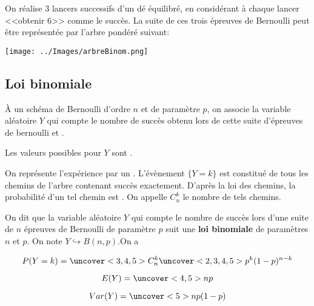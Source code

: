 \documentclass{beamer}
\begin{document}
 \begin{frame}
   \begin{example}
 On réalise $3$ lancers successifs d'un dé équilibré, en considérant à chaque lancer <<obtenir 6>>
 comme le succès. La suite de ces trois épreuves de Bernoulli peut être représentée par l'arbre pondéré
 suivant:
 
  \texttt{[image: ../Images/arbreBinom.png]}
 
  
 \end{example}
 \end{frame}

 \subsection{Loi binomiale}

 \begin{frame}
  
  \begin{definition}
  \`A un schéma de Bernoulli d'ordre $n$ et de paramètre $p$, on associe la variable aléatoire $Y$
  qui compte le nombre de succès obtenu lors de cette suite d'épreuves de bernoulli 
   et . 
  
  Les valeurs possibles pour $Y$ sont .
 \end{definition}
  On représente l'expérience par un . L'évènement $\lbrace Y=k \rbrace$ est constitué 
  de tous les chemins de l'arbre contenant  succès exactement. D'après la loi des chemins, la probabilité
  d'un tel chemin est . On appelle $C_n^k$ le nombre de tels chemins.

 \end{frame}

 \begin{frame}
  \begin{theorem}
   On dit que la variable aléatoire $Y$ qui compte le nombre de succès lors d'une suite de $n$ épreuves
   de Bernoulli de paramètre $p$ suit une \textbf{loi binomiale} de paramètres $n$ et $p$. On note 
   $Y \hookrightarrow B(n,p)$.On a 
   
   $$P(Y=k)=\uncover<3,4,5>{C_n^k} \uncover<2,3,4,5>{p^k (1-p)^{n-k}}$$
   
   $$E(Y)=\uncover<4,5>{np}$$
   
   $$Var(Y)=\uncover<5>{np(1-p)}$$
   
  \end{theorem}
\end{frame}
\end{document}
